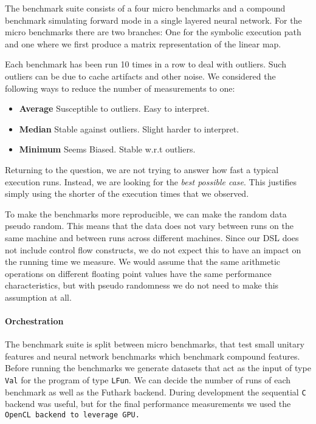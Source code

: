 The benchmark suite consists of a four micro benchmarks and a compound benchmark
simulating forward mode in a single layered neural network.
For the micro benchmarks there are two
branches:  One for the symbolic execution path and one where we first produce a
matrix representation of the linear map.

Each benchmark has been run 10 times in a row to deal with outliers.  Such
outliers can be due to cache artifacts and other noise.  We considered the
following ways to reduce the number of measurements to one:

\begin{itemize}
  \item \textbf{Average} Susceptible to outliers.  Easy to interpret.
  \item \textbf{Median} Stable against outliers.  Slight harder to interpret.
  \item \textbf{Minimum} Seems Biased. Stable w.r.t outliers.
\end{itemize}

Returning to the question, we are not trying to answer how fast a typical
execution runs.  Instead, we are looking for the \textit{best possible case}.
This justifies simply using the shorter of the execution times that we observed.

To make the benchmarks more reproducible, we can make the random data pseudo
random.  This means that the data does not vary between runs on the same machine and
between runs across different machines.  Since our DSL does not include control
flow constructs, we do not expect this to have an impact on the running time we
measure.  We would assume that the same arithmetic operations on different floating point
values have the same performance characteristics, but with pseudo randomness we
do not need to make this assumption at all.



\paragraph{Orchestration}  The benchmark suite is split between micro benchmarks,
that test small unitary features and neural network benchmarks which benchmark
compound features.  Before running the benchmarks we generate datasets that act
as the input of type \texttt{Val} for the program of type \texttt{LFun}.  We can
decide the number of runs of each benchmark as well as the Futhark backend.
During development the sequential \texttt{C} backend was useful, but for the
final performance measurements we used the \tt{OpenCL} backend to leverage GPU.\@

